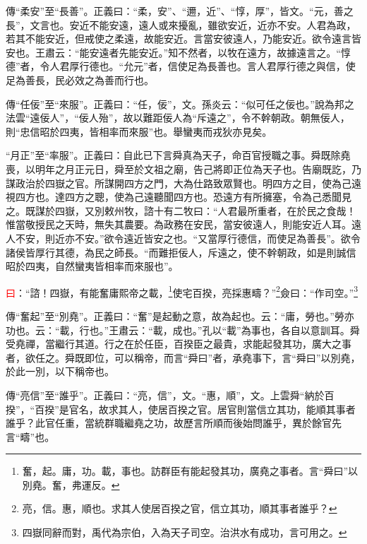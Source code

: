 {\noindent\zhuan{}\fzbyks 傳“柔安”至“長善”。正義曰：“柔，安”、“邇，近”、“惇，厚”，皆文。“元，善之長”，文言也。安近不能安遠，遠人或來擾亂，雖欲安近，近亦不安。人君為政，若其不能安近，但戒使之柔遠，故能安近。言當安彼遠人，乃能安近。欲令遠言皆安也。王肅云：“能安遠者先能安近。”知不然者，以牧在遠方，故據遠言之。“惇德”者，令人君厚行德也。“允元”者，信使足為長善也。言人君厚行德之與信，使足為善長，民必效之為善而行也。 \par}

{\noindent\zhuan{}\fzbyks 傳“任佞”至“來服”。正義曰：“任，佞”，文。孫炎云：“似可任之佞也。”說為邦之法雲“遠佞人”，“佞人殆”，故以難距佞人為“斥遠之”，令不幹朝政。朝無佞人，則“忠信昭於四夷，皆相率而來服”也。舉蠻夷而戎狄亦見矣。 \par}

{\noindent\shu{}\fzkt “月正”至“率服”。正義曰：自此已下言舜真為天子，命百官授職之事。舜既除堯喪，以明年之月正元日，舜至於文祖之廟，告己將即正位為天子也。告廟既訖，乃謀政治於四嶽之官。所謀開四方之門，大為仕路致眾賢也。明四方之目，使為己遠視四方也。達四方之聰，使為己遠聽聞四方也。恐遠方有所擁塞，令為己悉聞見之。既謀於四嶽，又別敕州牧，諮十有二牧曰：“人君最所重者，在於民之食哉！惟當敬授民之天時，無失其農要。為政務在安民，當安彼遠人，則能安近人耳。遠人不安，則近亦不安。”欲令遠近皆安之也。“又當厚行德信，而使足為善長”。欲令諸侯皆厚行其德，為民之師長。“而難拒佞人，斥遠之，使不幹朝政，如是則誠信昭於四夷，自然蠻夷皆相率而來服也”。 \par}

\textcolor{red}{曰}：“諮！四嶽，有能奮庸熙帝之載，\footnote{奮，起。庸，功。載，事也。訪群臣有能起發其功，廣堯之事者。言“舜曰”以別堯。奮，弗運反。}使宅百揆，亮採惠疇？”\footnote{亮，信。惠，順也。求其人使居百揆之官，信立其功，順其事者誰乎？}僉曰：“作司空。”\footnote{四嶽同辭而對，禹代為宗伯，入為天子司空。治洪水有成功，言可用之。}

{\noindent\zhuan{}\fzbyks 傳“奮起”至“別堯”。正義曰：“奮”是起動之意，故為起也。云：“庸，勞也。”勞亦功也。云：“載，行也。”王肅云：“載，成也。”孔以“載”為事也，各自以意訓耳。舜受堯禪，當繼行其道。行之在於任臣，百揆臣之最貴，求能起發其功，廣大之事者，欲任之。舜既即位，可以稱帝，而言“舜曰”者，承堯事下，言“舜曰”以別堯，於此一別，以下稱帝也。 \par}

{\noindent\zhuan{}\fzbyks 傳“亮信”至“誰乎”。正義曰：“亮，信”，文。“惠，順”，文。上雲舜“納於百揆”，“百揆”是官名，故求其人，使居百揆之官。居官則當信立其功，能順其事者誰乎？此官任重，當統群職繼堯之功，故歷言所順而後始問誰乎，異於餘官先言“疇”也。 \par}

